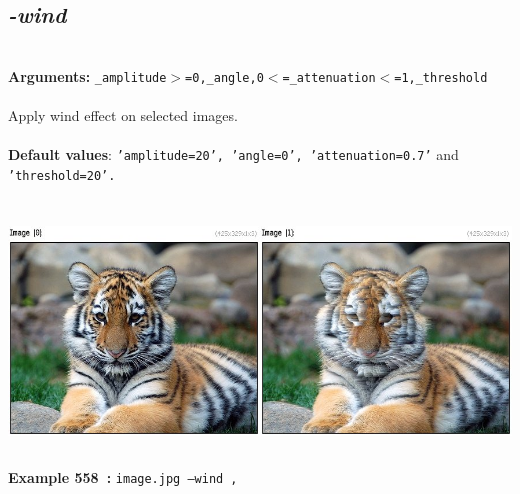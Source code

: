 \documentclass[a4paper,11pt,twoside]{book}
\begin{document}
\subsection{\emph{-wind} }\vspace*{-0.5em}
~\\\textbf{Arguments: } 
{\small \texttt{\_amplitude$>$=0,\_angle,0$<$=\_attenuation$<$=1,\_threshold}}\\~\\
Apply wind effect on selected images.
~\\~\\\textbf{Default values}: {\small \texttt{'amplitude=20', 'angle=0', 'attenuation=0.7'} and \texttt{'threshold=20'.}}
\begin{center}\includegraphics[keepaspectratio=true,height=7cm,width=\textwidth]{img/gmic_def558.jpg}\\
{\footnotesize \textbf{Example 558~:} \texttt{image.jpg --wind ,}}
\end{center}
\end{document}
